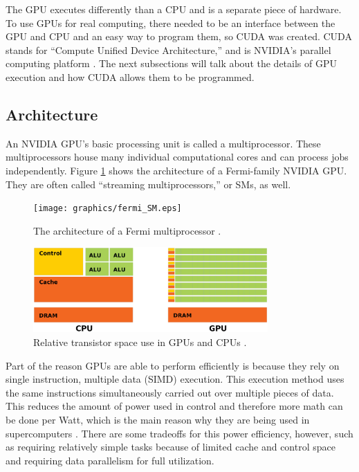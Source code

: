 The GPU executes differently than a CPU and is a separate piece of hardware.  To use GPUs for real computing, there needed to be an interface between the GPU and CPU and an easy way to program them, so CUDA was created.  CUDA stands for ``Compute Unified Device Architecture,'' and is NVIDIA's parallel computing platform \cite{cuda}.  The next subsections will talk about the details of GPU execution and how CUDA allows them to be programmed. 

\subsection{Architecture}

An NVIDIA GPU's basic processing unit is called a multiprocessor.  These multiprocessors house many individual computational cores and can process jobs independently.  Figure \ref{fermi_SM} shows the architecture of a Fermi-family NVIDIA GPU.  They are often called ``streaming multiprocessors,'' or SMs, as well.

\begin{figure}[h!] 
  \centering
    \texttt{[image: graphics/fermi\_SM.eps]}
     \caption[The architecture of a Fermi multiprocessor.]{The architecture of a Fermi multiprocessor \cite{cuda}. \label{fermi_SM}}
\end{figure}


\begin{figure}[h!] 
  \centering
    \includegraphics[width=0.8\textwidth]{graphics/CUDA_transistors.eps}
     \caption[Relative transistor space use in GPUs and CPUs.]{Relative transistor space use in GPUs and CPUs \cite{cuda}. \label{cuda_transistors}}
\end{figure}

Part of the reason GPUs are able to perform efficiently is because they rely on single instruction, multiple data (SIMD) execution.  This execution method uses the same instructions simultaneously carried out over multiple pieces of data.  This reduces the amount of power used in control and therefore more math can be done per Watt, which is the main reason why they are being used in supercomputers \cite{exascale}.  There are some tradeoffs for this power efficiency, however, such as requiring relatively simple tasks because of limited cache and control space and requiring data parallelism for full utilization.  

